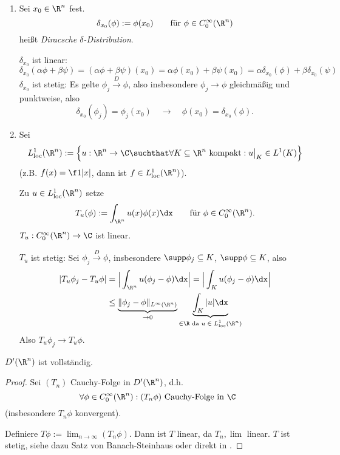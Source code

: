 \begin{ex} \label{5.5}
	\begin{enumerate}[1)]
		\item
			Sei $x_0 \in \R^n$ fest.
			\[
				\delta_{x_0}(\phi) := \phi(x_0) \qquad \text{für $\phi \in C_0^\infty(\R^n)$}
			\]
			heißt \emph{Diracsche $\delta$-Distribution}.

			$\delta_{x_0}$ ist linear:
			\[
				\delta_{x_0}(\alpha \phi + \beta \psi) 
				= (\alpha \phi + \beta \psi)(x_0)
				= \alpha \phi(x_0) + \beta \psi(x_0)
				= \alpha \delta_{x_0}(\phi) + \beta \delta_{x_0}(\psi)
			\]
			$\delta_{x_0}$ ist stetig: Es gelte $\phi_j \overset{D}\to \phi$, also insbesondere $\phi_j \to \phi$ gleichmäßig und punktweise, also
			\[
				\delta_{x_0}(\phi_j) = \phi_j(x_0) \quad \to \quad \phi(x_0) = \delta_{x_0}(\phi).
			\]
		\item
			Sei
			\[
				L_{\text{loc}}^1 (\R^n) := \Big\{ u : \R^n \to \C  \suchthat \forall K \subset \R^n  \text{ kompakt} : u\big|_K \in L^1(K) \Big\}
			\]
			(z.B. $f(x) = \f 1{|x|}$, dann ist $f \in L_{\text{loc}}^1(\R^n)$).

			Zu $u \in L_{\text{loc}}^1(\R^n)$ setze
			\[
				T_u(\phi) := \int_{\R^n} u(x) \phi(x) \dx \qquad \text{für $\phi \in C_0^\infty(\R^n)$}.
			\]
			$T_u : C_0^\infty(\R^n) \to \C$ ist linear.

			$T_u$ ist stetig:
			Sei $\phi_j \overset{D}{\to} \phi$, insbesondere $\supp \phi_j \subset K$, $\supp \phi \subset K$, also
			\begin{align*}
				|T_u \phi_j - T_u \phi| 
				&= \Big| \int_{\R^n} u (\phi_j-\phi) \dx \Big|
				= \Big| \int_{K} u (\phi_j-\phi) \dx \Big| \\
				&\le \underbrace{\|\phi_j - \phi\|_{L^\infty(\R^n)}}_{\to 0} \underbrace{\int_{K} |u| \dx}_{\in \R \text{ da $u\in L_{\text{loc}}^1(\R^n)$}}
			\end{align*}
			Also $T_u \phi_j \to T_u \phi$.
	\end{enumerate}
\end{ex}


\begin{st} \label{5.6}
	$D'(\R^n)$ ist vollständig.
	\begin{proof}
		Sei $(T_n)$ Cauchy-Folge in $D'(\R^n)$, d.h.
		\[
			\forall \phi \in C_0^\infty(\R^n) : (T_n \phi) \text{ Cauchy-Folge in $\C$}
		\]
		(insbesondere $T_n \phi$ konvergent).

		Definiere $T\phi := \lim_{n\to \infty} (T_n \phi)$.
		Dann ist $T$ linear, da $T_n, \lim$ linear.
		$T$ ist stetig, siehe dazu Satz von Banach-Steinhaus oder direkt in \cite{Walter}.
	\end{proof}
\end{st}

